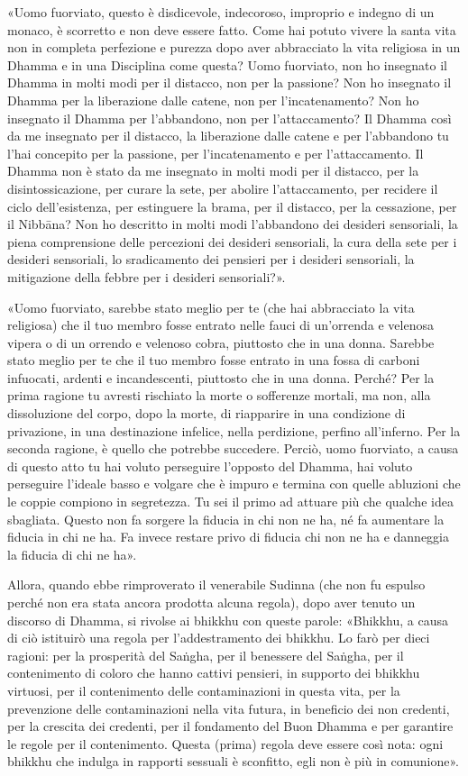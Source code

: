 «Uomo fuorviato, questo è disdicevole, indecoroso, improprio e indegno
di un monaco, è scorretto e non deve essere fatto. Come hai potuto
vivere la santa vita non in completa perfezione e purezza dopo aver
abbracciato la vita religiosa in un Dhamma e in una Disciplina come
questa? Uomo fuorviato, non ho insegnato il Dhamma in molti modi per il
distacco, non per la passione? Non ho insegnato il Dhamma per la
liberazione dalle catene, non per l’incatenamento? Non ho insegnato il
Dhamma per l’abbandono, non per l’attaccamento? Il Dhamma così da me
insegnato per il distacco, la liberazione dalle catene e per l’abbandono
tu l’hai concepito per la passione, per l’incatenamento e per
l’attaccamento. Il Dhamma non è stato da me insegnato in molti modi per
il distacco, per la disintossicazione, per curare la sete, per abolire
l’attaccamento, per recidere il ciclo dell’esistenza, per estinguere la
brama, per il distacco, per la cessazione, per il Nibbāna? Non ho
descritto in molti modi l’abbandono dei desideri sensoriali, la piena
comprensione delle percezioni dei desideri sensoriali, la cura della
sete per i desideri sensoriali, lo sradicamento dei pensieri per i
desideri sensoriali, la mitigazione della febbre per i desideri
sensoriali?».


«Uomo fuorviato, sarebbe stato meglio per te (che hai abbracciato la
vita religiosa) che il tuo membro fosse entrato nelle fauci di
un’orrenda e velenosa vipera o di un orrendo e velenoso cobra, piuttosto
che in una donna. Sarebbe stato meglio per te che il tuo membro fosse
entrato in una fossa di carboni infuocati, ardenti e incandescenti,
piuttosto che in una donna. Perché? Per la prima ragione tu avresti
rischiato la morte o sofferenze mortali, ma non, alla dissoluzione del
corpo, dopo la morte, di riapparire in una condizione di privazione, in
una destinazione infelice, nella perdizione, perfino all’inferno. Per la
seconda ragione, è quello che potrebbe succedere. Perciò, uomo
fuorviato, a causa di questo atto tu hai voluto perseguire l’opposto del
Dhamma, hai voluto perseguire l’ideale basso e volgare che è impuro e
termina con quelle abluzioni che le coppie compiono in segretezza. Tu
sei il primo ad attuare più che qualche idea sbagliata. Questo non fa
sorgere la fiducia in chi non ne ha, né fa aumentare la fiducia in chi
ne ha. Fa invece restare privo di fiducia chi non ne ha e danneggia la
fiducia di chi ne ha».


Allora, quando ebbe rimproverato il venerabile Sudinna (che non fu
espulso perché non era stata ancora prodotta alcuna regola), dopo aver
tenuto un discorso di Dhamma, si rivolse ai bhikkhu con queste parole:
«Bhikkhu, a causa di ciò istituirò una regola per l’addestramento dei
bhikkhu. Lo farò per dieci ragioni: per la prosperità del Saṅgha, per il
benessere del Saṅgha, per il contenimento di coloro che hanno cattivi
pensieri, in supporto dei bhikkhu virtuosi, per il contenimento delle
contaminazioni in questa vita, per la prevenzione delle contaminazioni
nella vita futura, in beneficio dei non credenti, per la crescita dei
credenti, per il fondamento del Buon Dhamma e per garantire le regole
per il contenimento. Questa (prima) regola deve essere così nota: ogni
bhikkhu che indulga in rapporti sessuali è sconfitto, egli non è più in
comunione».


